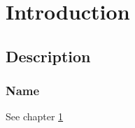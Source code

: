 \documentclass[11pt]{report}
\begin{document}

\chapter{Introduction}
\label{chap:Intro}

\section{Description}
\label{sec:IntroDescr}

\subsection{Name}
\label{subsec:IntroDescrName}

\label{fig:FigName}

\label{tab:TabName}

See chapter \ref{chap:Intro}
\end{document}
